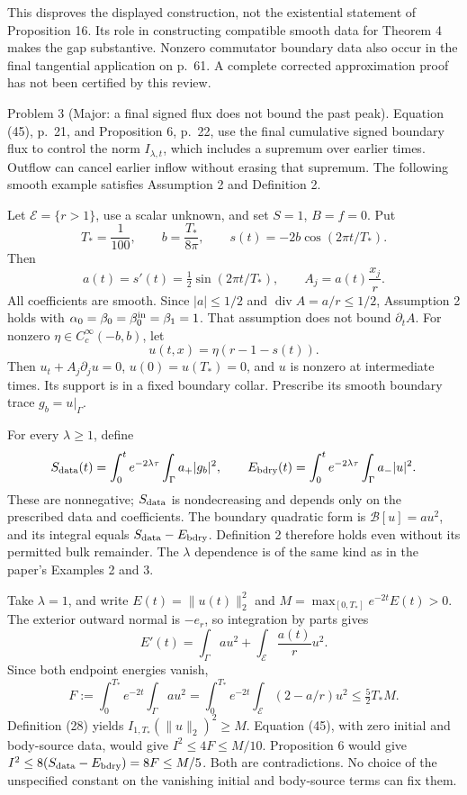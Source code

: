 \documentclass[10pt]{article}
\begin{document}
This disproves the displayed construction, not the existential statement of Proposition 16. Its role in constructing compatible smooth data for Theorem 4 makes the gap substantive. Nonzero commutator boundary data also occur in the final tangential application on p. 61. A complete corrected approximation proof has not been certified by this review.\par
Problem 3 (Major: a final signed flux does not bound the past peak).  Equation (45), p. 21, and Proposition 6, p. 22, use the final cumulative signed boundary flux to control the norm \(I_{\lambda,t}\), which includes a supremum over earlier times. Outflow can cancel earlier inflow without erasing that supremum. The following smooth example satisfies Assumption 2 and Definition 2.\par
Let \(\mathcal E=\{r>1\}\), use a scalar unknown, and set \(S=1\), \(B=f=0\). Put \[T_*=\frac1{100},\qquad b=\frac{T_*}{8\pi},\qquad
 s(t)=-2b\cos(2\pi t/T_*).\] Then \[a(t)=s'(t)=\tfrac12\sin(2\pi t/T_*),
 \qquad A_j=a(t)\frac{x_j}{r}.\] All coefficients are smooth. Since \(|a|\le1/2\) and \(\mathop{\mathrm{div}}A=a/r\le1/2\), Assumption 2 holds with \(\alpha_0=\beta_0=\beta_0^{\rm in}=\beta_1=1\). That assumption does not bound \(\partial_t A\). For nonzero \(\eta\in C_c^\infty(-b,b)\), let \[u(t,x)=\eta(r-1-s(t)).\] Then \(u_t+A_j\partial_j u=0\), \(u(0)=u(T_*)=0\), and \(u\) is nonzero at intermediate times. Its support is in a fixed boundary collar. Prescribe its smooth boundary trace \(g_b=u|_\Gamma\).\par
For every \(\lambda\ge1\), define \[S_{\rm data}(t)=\int_0^t e^{-2\lambda\tau}
                  \int_\Gamma a_+|g_b|^2,\qquad
 E_{\rm bdry}(t)=\int_0^t e^{-2\lambda\tau}
                  \int_\Gamma a_-|u|^2 .\] These are nonnegative; \(S_{\rm data}\) is nondecreasing and depends only on the prescribed data and coefficients. The boundary quadratic form is \(\mathcal B[u]=a u^2\), and its integral equals \(S_{\rm data}-E_{\rm bdry}\). Definition 2 therefore holds even without its permitted bulk remainder. The \(\lambda\) dependence is of the same kind as in the paper’s Examples 2 and 3.\par
Take \(\lambda=1\), and write \(E(t)=\|u(t)\|_2^2\) and \(M=\max_{[0,T_*]}e^{-2t}E(t)>0\). The exterior outward normal is \(-e_r\), so integration by parts gives \[E'(t)=\int_\Gamma a u^2+\int_\mathcal E\frac{a(t)}r u^2.\] Since both endpoint energies vanish, \[F:=\int_0^{T_*}e^{-2t}\int_\Gamma a u^2
 =\int_0^{T_*}e^{-2t}\int_\mathcal E(2-a/r)u^2
 \le\tfrac52 T_*M.\] Definition (28) yields \(I_{1,T_*}(\|u\|_2)^2\ge M\). Equation (45), with zero initial and body-source data, would give \(I^2\le4F\le M/10\). Proposition 6 would give \(I^2\le8(S_{\rm data}-E_{\rm bdry})=8F\le M/5\). Both are contradictions. No choice of the unspecified constant on the vanishing initial and body-source terms can fix them.\par
\end{document}
